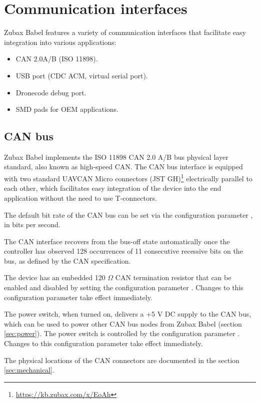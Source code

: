 \documentclass{zubaxdoc}
\begin{document}
\section{Communication interfaces}

Zubax Babel features a variety of communication interfaces that facilitate easy integration into various
applications:
\begin{itemize}
    \item CAN 2.0A/B (ISO 11898).
    \item USB port (CDC ACM, virtual serial port).
    \item Dronecode debug port.
    \item SMD pads for OEM applications.
\end{itemize}

\subsection{CAN bus}\label{sec:can_bus}

Zubax Babel implements the ISO 11898 CAN 2.0 A/B bus physical layer standard, also known as high-speed CAN.
The CAN bus interface is equipped with two standard
UAVCAN Micro connectors (JST GH)\footnote{\url{https://kb.zubax.com/x/EoAh}}
electrically parallel to each other,
which facilitates easy integration of the device into the end application without the need to use T-connectors.

The default bit rate of the CAN bus can be set via the configuration parameter ,
in bits per second.

The CAN interface recovers from the bus-off state automatically once the controller has
observed 128 occurrences of 11 consecutive recessive bits on the bus, as defined by the CAN specification.

The device has an embedded 120 $\Omega$ CAN termination resistor that can be enabled and disabled
by setting the configuration parameter .
Changes to this configuration parameter take effect immediately.

The power switch, when turned on, delivers a +5 V DC supply to the CAN bus,
which can be used to power other CAN bus nodes from Zubax Babel
(section \ref{sec:power}).
The power switch is controlled by the configuration parameter .
Changes to this configuration parameter take effect immediately.

The physical locations of the CAN connectors are documented in the section \ref{sec:mechanical}.
\end{document}
